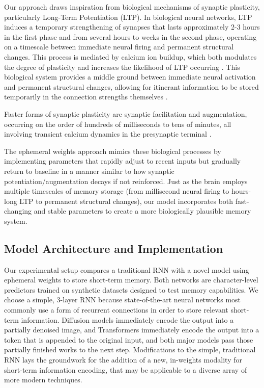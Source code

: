 \documentclass[conference]{IEEEtran}
\begin{document}
Our approach draws inspiration from biological mechanisms of synaptic plasticity, particularly Long-Term Potentiation (LTP). In biological neural networks, LTP induces a temporary strengthening of synapses that lasts approximately 2-3 hours in the first phase and from several hours to weeks in the second phase, operating on a timescale between immediate neural firing and permanent structural changes. This process is mediated by calcium ion buildup, which both modulates the degree of plasticity and increases the likelihood of LTP occurring \cite{lynchLongtermPotentiationMemory2004}. This biological system provides a middle ground between immediate neural activation and permanent structural changes, allowing for itinerant information to be stored temporarily in the connection strengths themselves \cite{martinSynapticPlasticityMemory2000}.

Faster forms of synaptic plasticity are synaptic facilitation and augmentation, occurring on the order of hundreds of milliseconds to tens of minutes, all involving transient calcium dynamics in the presynaptic terminal \cite{regehrShortTermPresynapticPlasticity2012}.

The ephemeral weights approach mimics these biological processes by implementing parameters that rapidly adjust to recent inputs but gradually return to baseline in a manner similar to how synaptic potentiation/augmentation decays if not reinforced. Just as the brain employs multiple timescales of memory storage (from millisecond neural firing to hours-long LTP to permanent structural changes), our model incorporates both fast-changing and stable parameters to create a more biologically plausible memory system.

\subsection{Model Architecture and Implementation}

Our experimental setup compares a traditional RNN with a novel model using ephemeral weights to store short-term memory. Both networks are character-level predictors trained on synthetic datasets designed to test memory capabilities. We choose a simple, 3-layer RNN because state-of-the-art neural networks most commonly use a form of recurrent connections in order to store relevant short-term information. Diffusion models immediately encode the output into a partially denoised image, and Transformers immediately encode the output into a token that is appended to the original input, and both major models pass those partially finished works to the next step. Modifications to the simple, traditional RNN lays the groundwork for the addition of a new, in-weights modality for short-term information encoding, that may be applicable to a diverse array of more modern techniques.
\end{document}
